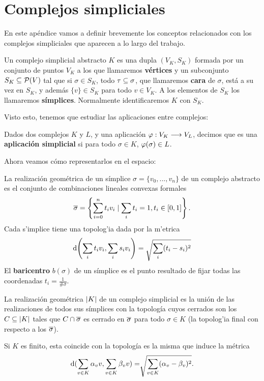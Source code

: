 \chapter{Complejos simpliciales}\label{apendice}
En este apéndice vamos a definir brevemente los conceptos relacionados con los complejos simpliciales que aparecen a lo largo del trabajo. 
\begin{definition}
  Un complejo simplicial abstracto $ K $  es una dupla $ (V_K,S_K) $ formada por un conjunto de puntos $ V_K $ a los que llamaremos \textbf{vértices} y un subconjunto $ S_K\subseteq \mathcal{P}(V) $ tal que si $ \sigma\in S_K $, todo $ \tau\subseteq \sigma $, que llamaremos \textbf{cara} de $ \sigma $, está a su vez en $ S_K $, y además $ \{v\}\in S_K $ para todo $ v\in V_K $. A los elementos de $ S_K $ los llamaremos \textbf{símplices}. Normalmente identificaremos $ K $ con $ S_K $.
\end{definition}
Visto esto, tenemos que estudiar las aplicaciones entre complejos:
\begin{definition}
  Dados dos complejos $ K $ y $ L $, y una aplicación $ \varphi:V_K\longrightarrow V_L $, decimos que es una \textbf{aplicación simplicial} si para todo $ \sigma \in K $, $ \varphi(\sigma)\in L $.
\end{definition}
 
Ahora veamos cómo representarlos en el espacio:
\begin{definition}
  La realización geométrica de un símplice $ \sigma= \{v_0,...,v_n\} $ de un complejo abstracto es el conjunto de combinaciones lineales convexas formales
  \begin{gather*}
    \overline{\sigma } = \left\{\sum_{i=0}^n t_iv_i\mid \sum_{i}t_i = 1, t_i\in [0,1]\right\}.
  \end{gather*}
 Cada s'implice tiene una topolog'ia dada por la m'etrica 
 \begin{gather*}
     \dd(\sum_i t_iv_i ,\sum_i s_iv_i) = \sqrt{\sum_i (t_i-s_i)^2 }
 \end{gather*}
 El \textbf{baricentro} $ b(\sigma) $ de un símplice es el punto resultado de fijar todas las coordenadas $ t_i=\frac{1}{\#\sigma} $.
\end{definition}
\begin{definition}
  La realización geométrica $ \abs{K} $ de un complejo simplicial es la unión de las realizaciones de todos sus símplices con la topología cuyos cerrados son los $ C\subseteq \abs{K} $ tales que $ C\cap\overline{\sigma } $ es cerrado en $ \overline{\sigma} $ para todo $ \sigma\in K $ (la topolog'ia final con respecto a los $\overline{\sigma}$).
\end{definition}
Si $ K $ es finito, esta coincide con la topología  es la misma que induce la métrica 
\begin{gather*}
  \text{d}(\sum_{v\in K}\alpha_v v,\sum_{v\in K}\beta_v v ) = \sqrt[]{\sum_{v\in K}(\alpha_v-\beta_v)^2 }.
\end{gather*}

